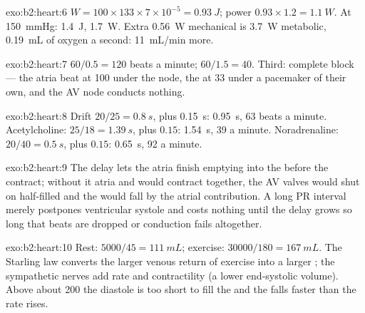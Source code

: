 \begin{solution}{exo:b2:heart:6}
$W = 100\times 133\times 7\times 10^{-5} = \qty{0.93}{J}$; power
$0.93\times 1.2 = \qty{1.1}{W}$. At \qty{150}{mmHg}: \qty{1.4}{J},
\qty{1.7}{W}. Extra \qty{0.56}{W} mechanical is \qty{3.7}{W}
metabolic, \qty{0.19}{mL} of oxygen a second: \qty{11}{mL/min} more.
\end{solution}

\begin{solution}{exo:b2:heart:7}
$60/0.5 = 120$ beats a minute; $60/1.5 = 40$. Third: complete 
block --- the atria beat at 100 under the node, the  at 33
under a pacemaker of their own, and the AV node conducts nothing.
\end{solution}

\begin{solution}{exo:b2:heart:8}
Drift $20/25 = \qty{0.8}{s}$, plus \qty{0.15}{s}: \qty{0.95}{s}, 63
beats a minute. Acetylcholine: $25/18 = \qty{1.39}{s}$, plus $0.15$:
\qty{1.54}{s}, 39 a minute. Noradrenaline: $20/40 = \qty{0.5}{s}$,
plus $0.15$: \qty{0.65}{s}, 92 a minute.
\end{solution}

\begin{solution}{exo:b2:heart:9}
The delay lets the atria finish emptying into the  before
the  contract; without it atria and  would
contract together, the AV valves would shut on half-filled
 and the  would fall by the atrial
contribution. A long PR interval merely postpones ventricular
systole and costs nothing until the delay grows so long that beats
are dropped or conduction fails altogether.
\end{solution}

\begin{solution}{exo:b2:heart:10}
Rest: $5000/45 = \qty{111}{mL}$; exercise: $\num{30000}/180 =
\qty{167}{mL}$. The Starling law converts the larger venous return
of exercise into a larger ; the sympathetic nerves add
rate and contractility (a lower end-systolic volume). Above about
200 the diastole is too short to fill the  and the  falls faster than the rate rises.
\end{solution}

